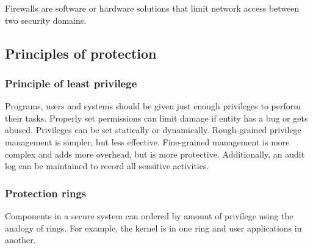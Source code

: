 Firewalls are software or hardware solutions that limit network access between two security domains.

\subsection{Principles of protection}
\subsubsection{Principle of least privilege}
Programs, users and systems should be given just enough privileges to perform their tasks. Properly set permissions can limit damage if entity has a bug or gets abused. Privileges can be set statically or dynamically. Rough-grained privilege management is simpler, but less effective. Fine-grained management is more complex and adds more overhead, but is more protective. Additionally, an audit log can be maintained to record all sensitive activities.

\subsubsection{Protection rings}
Components in a secure system can ordered by amount of privilege using the analogy of rings. For example, the kernel is in one ring and user applications in another.